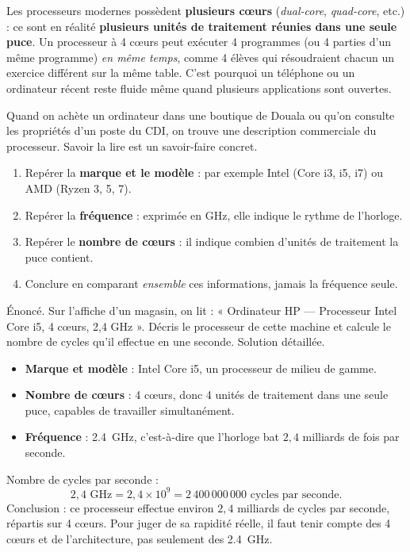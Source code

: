 \documentclass[11pt]{article}
\newcounter{popsec}
\newcounter{popsub}
\newcommand{\courssub}[1]{%
  \stepcounter{popsub}%
  \par\vspace{9pt}\noindent{\popxbold\fontsize{11.5}{13}\selectfont\color{popink}{\color{poporange}\thepopsec.\thepopsub}\hspace{6pt}#1}\par\nopagebreak\vspace{4pt}
}
\begin{document}
\begin{savaistu}
Les processeurs modernes possèdent \textbf{plusieurs cœurs} (\emph{dual-core}, \emph{quad-core}, etc.) : ce sont en réalité \textbf{plusieurs unités de traitement réunies dans une seule puce}. Un processeur à 4 cœurs peut exécuter 4 programmes (ou 4 parties d'un même programme) \emph{en même temps}, comme 4 élèves qui résoudraient chacun un exercice différent sur la même table. C'est pourquoi un téléphone ou un ordinateur récent reste fluide même quand plusieurs applications sont ouvertes.
\end{savaistu}

\courssub{Lire l'étiquette d'un processeur}

Quand on achète un ordinateur dans une boutique de Douala ou qu'on consulte les propriétés d'un poste du CDI, on trouve une description commerciale du processeur. Savoir la lire est un savoir-faire concret.

\begin{methode}
\begin{enumerate}
\item Repérer la \textbf{marque et le modèle} : par exemple Intel (Core i3, i5, i7) ou AMD (Ryzen 3, 5, 7).
\item Repérer la \textbf{fréquence} : exprimée en GHz, elle indique le rythme de l'horloge.
\item Repérer le \textbf{nombre de cœurs} : il indique combien d'unités de traitement la puce contient.
\item Conclure en comparant \emph{ensemble} ces informations, jamais la fréquence seule.
\end{enumerate}
\end{methode}

\begin{exoresolu}
Énoncé. Sur l'affiche d'un magasin, on lit : « Ordinateur HP — Processeur Intel Core i5, 4 cœurs, 2,4 GHz ». Décris le processeur de cette machine et calcule le nombre de cycles qu'il effectue en une seconde.
\tcblower
Solution détaillée.
\begin{itemize}
\item \textbf{Marque et modèle} : Intel Core i5, un processeur de milieu de gamme.
\item \textbf{Nombre de cœurs} : 4 cœurs, donc 4 unités de traitement dans une seule puce, capables de travailler simultanément.
\item \textbf{Fréquence} : \SI{2,4}{GHz}, c'est-à-dire que l'horloge bat $2,4$ milliards de fois par seconde.
\end{itemize}
Nombre de cycles par seconde :
\[ 2,4 \text{ GHz} = 2,4 \times 10^{9} = 2\,400\,000\,000 \text{ cycles par seconde.} \]
Conclusion : ce processeur effectue environ $2,4$ milliards de cycles par seconde, répartis sur 4 cœurs. Pour juger de sa rapidité réelle, il faut tenir compte des 4 cœurs et de l'architecture, pas seulement des \SI{2,4}{GHz}.
\end{exoresolu}
\end{document}
